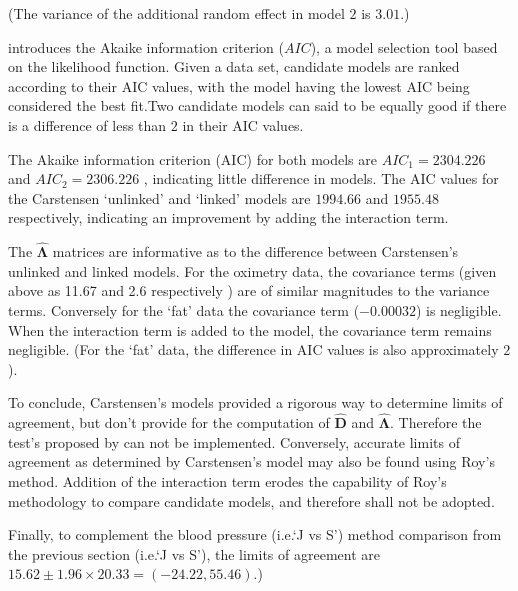 \documentclass[12pt, a4paper]{report}
\theoremstyle{plain}
\theoremstyle{definition}
\theoremstyle{remark}
\begin{document}
	\noindent (The variance of the additional random effect in model $2$ is $3.01$.)
	
	\citet{akaike} introduces the Akaike information criterion ($AIC$), a model 
	selection tool based on the likelihood function. Given a data set, candidate models
	are ranked according to their AIC values, with the model having the lowest AIC being considered the best fit.Two candidate models can said to be equally good if there is a difference of less than $2$ in their AIC values.
	
	The Akaike information criterion (AIC) for both models are $AIC_{1} = 2304.226$ and $AIC_{2} = 2306.226$ , indicating little difference in models. The AIC values for the Carstensen `unlinked' and `linked' models are $1994.66$ and $1955.48$ respectively, indicating an improvement by adding the interaction term.
	
	The $\boldsymbol{\hat{\Lambda}}$ matrices are informative as to the difference between Carstensen's unlinked and linked models. For the oximetry data, the covariance terms (given above as 11.67 and 2.6 respectively ) are of similar magnitudes to the variance terms. Conversely for the `fat' data the covariance term ($-0.00032$) is negligible. When the interaction term is added to the model, the covariance term remains negligible. (For the `fat' data, the difference in AIC values is also approximately $2$).
	
	To conclude, Carstensen's models provided a rigorous way to determine limits of agreement, but don't provide for the computation of $\boldsymbol{\hat{D}}$ and $\boldsymbol{\hat{\Lambda}}$. Therefore the test's proposed by \citet{roy} can not be implemented. Conversely, accurate limits of agreement as determined by Carstensen's model may also be found using Roy's method. Addition of the interaction term erodes the capability of Roy's methodology to compare candidate models, and therefore shall not be adopted.
	
	Finally, to complement the blood pressure (i.e.`J vs S') method comparison from the previous section (i.e.`J vs S'), the limits of agreement are $15.62 \pm 1.96 \times 20.33 = (-24.22, 55.46)$.)
	\newpage
	
\end{document}
